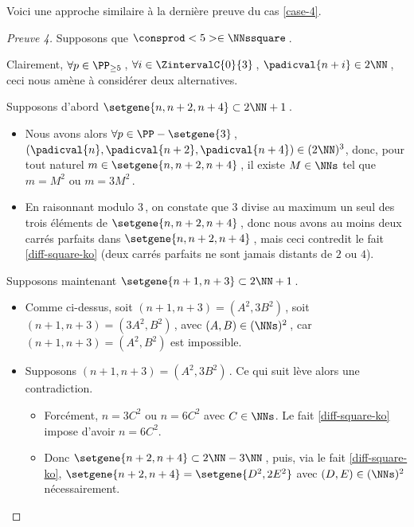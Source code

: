 

Voici une approche similaire à la dernière preuve du cas \ref{case-4}.
	
	
\begin{proof}[Preuve 4]
    Supposons que $\consprod<5> \in \NNssquare$\,.
    
    \smallskip
    
	Clairement, $\forall p \in \PP_{\geq 5}$\,, 
   	$\forall i \in \ZintervalC{0}{3}$\,, 
    $\padicval{n + i} \in 2 \NN$\,,
    ceci nous amène à considérer deux alternatives.
    
    \medskip
    
    Supposons d'abord $\setgene{n, n + 2, n + 4} \subset 2 \NN + 1$\,.
	\begin{itemize}
		\item
		Nous avons alors
		$\forall p \in \PP - \setgene{3}$\,, 
   		$(\padicval{n}, \padicval{n+2}, \padicval{n+4}) \in ( 2 \NN )^3$,
		donc, pour tout naturel $m \in \setgene{n, n + 2, n + 4}$\,, 
		il existe $M \in \NNs$ tel que 
		$m = M^2$ ou $m = 3 M^2$\,.
	
		\item En raisonnant modulo $3$\,, on constate que $3$ divise au maximum un seul des trois éléments de $\setgene{n, n + 2, n + 4}$\,, donc nous avons au moins deux carrés parfaits dans $\setgene{n, n + 2, n + 4}$\,, mais ceci contredit le fait \ref{diff-square-ko} (deux carrés parfaits ne sont jamais distants de $2$ ou $4$).
    \end{itemize}
    
    \medskip
    
    Supposons maintenant $\setgene{n + 1, n + 3} \subset 2 \NN + 1$\,.
	\begin{itemize}
		\item
		Comme ci-dessus,
		soit $(n + 1, n + 3) = (A^2, 3 B^2)$\,,
		soit $(n + 1, n + 3) = (3 A^2, B^2)$\,,
		avec $(A, B) \in ( \NNs )^2$\,,
		car $(n + 1, n + 3) = (A^2, B^2)$ est impossible.
	
		\item Supposons $(n + 1, n + 3) = (A^2, 3 B^2)$\,. Ce qui suit lève alors une contradiction.
		\begin{itemize}
			\item Forcément, $n = 3 C^2$ ou $n = 6 C^2$ avec $C \in \NNs$.
			Le fait \ref{diff-square-ko} impose d'avoir $n = 6 C^2$.

			\item Donc 
			$\setgene{n + 2, n + 4} \subset 2 \NN - 3 \NN$\,, 
			puis, via le fait \ref{diff-square-ko},
			$\setgene{n + 2, n + 4} = \setgene{D^2, 2 E^2}$ 
			avec $(D, E) \in ( \NNs )^2$ nécessairement.


\end{itemize}
\end{itemize}
\end{proof}
